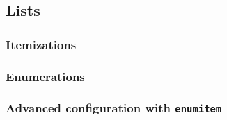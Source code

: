 \subsection{Lists}
\subsubsection*{Itemizations}
\subsubsection*{Enumerations}
\subsubsection*{Advanced configuration with \texttt{enumitem}}
